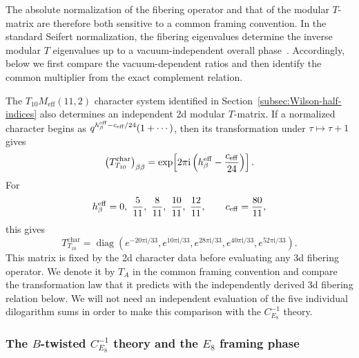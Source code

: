 \documentclass[11pt,a4paper]{article}
\numberwithin{equation}{section}
\begin{document}
The absolute normalization of the fibering operator and that of the modular $T$-matrix are therefore both sensitive to a common framing convention.  In the standard Seifert normalization, the fibering eigenvalues determine the inverse modular $T$ eigenvalues up to a vacuum-independent overall phase~\cite{Closset:2017zgf,ClossetKimWillett:2018Seifert,Gang:2023rei,GangKimParkStubbs:2024Nahm}.  Accordingly, below we first compare the vacuum-dependent ratios and then identify the common multiplier from the exact complement relation.

The $T_{10}M_{\mathrm{eff}}(11,2)$ character system identified in Section~\ref{subsec:Wilson-half-indices} also determines an independent 2d modular $T$-matrix.  If a normalized character begins as $q^{h_\beta^{\rm eff}-c_{\rm eff}/24}(1+\cdots)$, then its transformation under $\tau\mapsto\tau+1$ gives
\begin{equation}
  \bigl(T_{T_{10}}^{\mathrm{char}}\bigr)_{\beta\beta}
  =\exp\!\left[
    2\pi\mathrm{i}\left(
      h_\beta^{\rm eff}-\frac{c_{\rm eff}}{24}
    \right)
  \right].
  \label{eq:T10-character-T-definition}
\end{equation}
For
\begin{equation}
  h_\beta^{\rm eff}
  =0,\ \frac5{11},\ \frac8{11},\ \frac{10}{11},\ \frac{12}{11},
  \qquad
  c_{\rm eff}=\frac{80}{11},
\end{equation}
this gives
\begin{equation}
  T_{T_{10}}^{\mathrm{char}}
  =\operatorname{diag}\!\left(
  e^{-20\pi \mathrm{i}/33},
  e^{10\pi \mathrm{i}/33},
  e^{28\pi \mathrm{i}/33},
  e^{40\pi \mathrm{i}/33},
  e^{52\pi \mathrm{i}/33}
  \right).
  \label{eq:CE8-T-matrix}
\end{equation}
This matrix is fixed by the 2d character data before evaluating any 3d fibering operator.  We denote it by $T_A$ in the common framing convention and compare the transformation law that it predicts with the independently derived 3d fibering relation below.  We will not need an independent evaluation of the five individual dilogarithm sums in order to make this comparison with the $C_{E_8}^{-1}$ theory.

\subsubsection{The $B$-twisted $C_{E_8}^{-1}$ theory and the $E_8$ framing phase}
\label{subsubsec:B-twisted-CE8inv-T}
\end{document}
